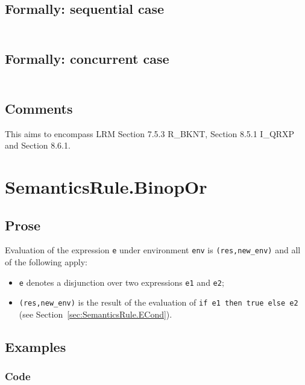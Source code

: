 \documentclass{book}
\begin{document}
  \subsection{Formally: sequential case}
  \begin{align}
  \end{align} 

  \subsection{Formally: concurrent case}
  \begin{align}
  \end{align} 

  \subsection{Comments}
  This aims to encompass LRM Section 7.5.3 R\_BKNT, Section 8.5.1 I\_QRXP and Section
  8.6.1.

\section{SemanticsRule.BinopOr \label{sec:SemanticsRule.BinopOr}}
  \subsection{Prose}

  Evaluation of the expression \texttt{e} under environment \texttt{env} is
  \texttt{(res,new\_env)} and all of the following apply:
  \begin{itemize}
  \item \texttt{e} denotes a disjunction over two expressions \texttt{e1} and \texttt{e2};
  \item \texttt{(res,new\_env)} is the result of the evaluation of \texttt{if 
e1 then true else e2} (see Section~\ref{sec:SemanticsRule.ECond}).
  \end{itemize}

  \subsection{Examples}

  \subsubsection{Code}
\end{document}
